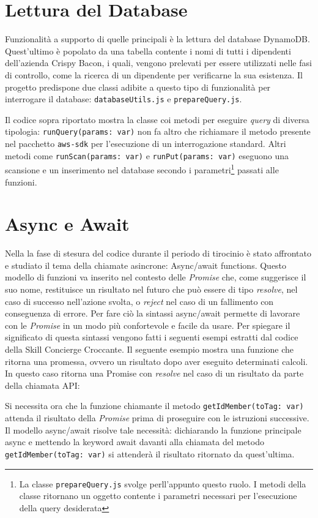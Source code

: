 \newpage
\section{Lettura del Database}
Funzionalità a supporto di quelle principali è la lettura del database DynamoDB. Quest'ultimo è popolato da una tabella contente i nomi di tutti i dipendenti dell'azienda Crispy Bacon, i quali, vengono prelevati per essere utilizzati nelle fasi di controllo, come la ricerca di un dipendente per verificarne la sua esistenza. Il progetto predispone due classi adibite a questo tipo di funzionalità per interrogare il database: \texttt{databaseUtils.js} e \texttt{prepareQuery.js}.


Il codice sopra riportato mostra la classe coi metodi per eseguire \textit{query} di diversa tipologia: \texttt{runQuery(params:  var)} non fa altro che richiamare il metodo presente nel pacchetto \texttt{aws-sdk} per l'esecuzione di un interrogazione standard. Altri metodi come \texttt{runScan(params:  var)} e \texttt{runPut(params:  var)} eseguono una scansione e un inserimento nel database secondo i parametri\footnote{La classe \texttt{prepareQuery.js} svolge perll'appunto questo ruolo. I metodi della classe ritornano un oggetto contente i parametri necessari per l'esecuzione della query desiderata} passati alle funzioni.

\newpage
\section{Async e Await}
Nella la fase di stesura del codice durante il periodo di tirocinio è stato affrontato e studiato il tema della chiamate asincrone: Async/await functions. Questo modello di funzioni va inserito nel contesto delle \textit{Promise} che, come suggerisce il suo nome, restituisce un risultato nel futuro che può essere di tipo \textit{resolve}, nel caso di successo nell'azione svolta, o \textit{reject} nel caso di un fallimento con conseguenza di errore. Per fare ciò la sintassi async/await permette di lavorare con le \textit{Promise} in un modo più confortevole e facile da usare. Per spiegare il significato di questa sintassi vengono fatti i seguenti esempi estratti dal codice della Skill Concierge Croccante. Il seguente esempio mostra una funzione che ritorna una promessa, ovvero un risultato dopo aver eseguito determinati calcoli. In questo caso ritorna una Promise con \textit{resolve} nel caso di un risultato da parte della chiamata API:

\noindent Si necessita ora che la funzione chiamante il metodo \texttt{getIdMember(toTag: var)} attenda il risultato della \textit{Promise} prima di proseguire con le istruzioni successive. Il modello async/await risolve tale necessità: dichiarando la funzione principale async e mettendo la keyword await davanti alla chiamata del metodo \texttt{getIdMember(toTag: var)} si attenderà il risultato ritornato da quest'ultima.




